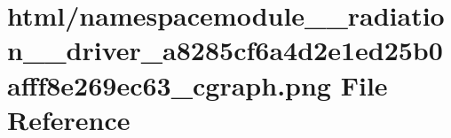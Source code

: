 \hypertarget{namespacemodule____radiation____driver__a8285cf6a4d2e1ed25b0afff8e269ec63__cgraph_8png}{}\section{html/namespacemodule\+\_\+\+\_\+radiation\+\_\+\+\_\+driver\+\_\+a8285cf6a4d2e1ed25b0afff8e269ec63\+\_\+cgraph.png File Reference}
\label{namespacemodule____radiation____driver__a8285cf6a4d2e1ed25b0afff8e269ec63__cgraph_8png}
